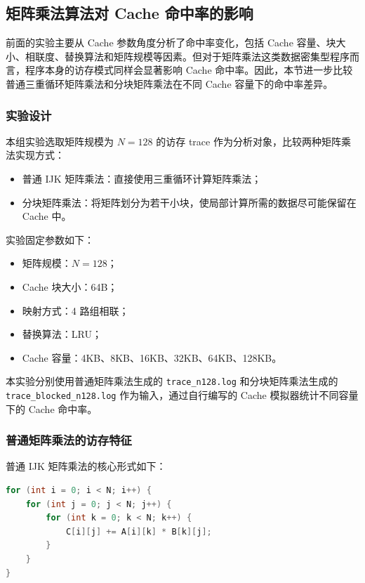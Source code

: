 \subsection{矩阵乘法算法对 Cache 命中率的影响}

前面的实验主要从 Cache 参数角度分析了命中率变化，包括 Cache 容量、块大小、相联度、替换算法和矩阵规模等因素。但对于矩阵乘法这类数据密集型程序而言，程序本身的访存模式同样会显著影响 Cache 命中率。因此，本节进一步比较普通三重循环矩阵乘法和分块矩阵乘法在不同 Cache 容量下的命中率差异。

\subsubsection{实验设计}

本组实验选取矩阵规模为 $N=128$ 的访存 trace 作为分析对象，比较两种矩阵乘法实现方式：

\begin{itemize}
    \item 普通 IJK 矩阵乘法：直接使用三重循环计算矩阵乘法；
    \item 分块矩阵乘法：将矩阵划分为若干小块，使局部计算所需的数据尽可能保留在 Cache 中。
\end{itemize}

实验固定参数如下：

\begin{itemize}
    \item 矩阵规模：$N=128$；
    \item Cache 块大小：64B；
    \item 映射方式：4 路组相联；
    \item 替换算法：LRU；
    \item Cache 容量：4KB、8KB、16KB、32KB、64KB、128KB。
\end{itemize}

本实验分别使用普通矩阵乘法生成的 \texttt{trace\_n128.log} 和分块矩阵乘法生成的 \texttt{trace\_blocked\_n128.log} 作为输入，通过自行编写的 Cache 模拟器统计不同容量下的 Cache 命中率。

\subsubsection{普通矩阵乘法的访存特征}

普通 IJK 矩阵乘法的核心形式如下：

\begin{lstlisting}[language=C, caption={普通 IJK 矩阵乘法}]
for (int i = 0; i < N; i++) {
    for (int j = 0; j < N; j++) {
        for (int k = 0; k < N; k++) {
            C[i][j] += A[i][k] * B[k][j];
        }
    }
}
\end{lstlisting}

